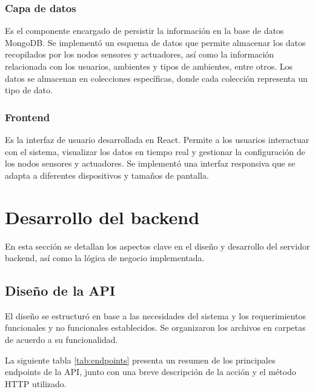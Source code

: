 \subsubsection{Capa de datos}

Es el componente encargado de persistir la información en la base de datos
MongoDB. Se implementó un esquema de datos que permite almacenar los datos
recopilados por los nodos sensores y actuadores, así como la información
relacionada con los usuarios, ambientes y tipos de ambientes, entre otros. Los
datos se almacenan en colecciones específicas, donde cada colección representa
un tipo de dato.

\subsubsection{Frontend}

Es la interfaz de usuario desarrollada en React. Permite a los usuarios
interactuar con el sistema, visualizar los datos en tiempo real y gestionar la
configuración de los nodos sensores y actuadores. Se implementó una interfaz
responsiva que se adapta a diferentes dispositivos y tamaños de pantalla.

\section{Desarrollo del backend}

En esta sección se detallan los aspectos clave en el diseño y desarrollo del
servidor backend, así como la lógica de negocio implementada.

\subsection{Diseño de la API}

El diseño se estructuró en base a las necesidades del sistema y los
requerimientos funcionales y no funcionales establecidos. Se organizaron los
archivos en carpetas de acuerdo a su funcionalidad. %

La siguiente tabla \ref{tab:endpoints} presenta un resumen de los principales
endpoints de la API, junto con una breve descripción de la acción y el método
HTTP utilizado.

